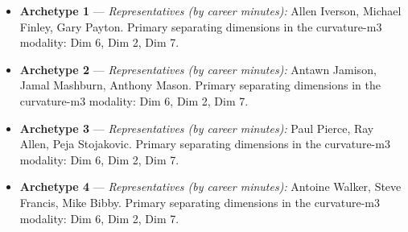 \begin{itemize}
\item \textbf{Archetype 1} --- \emph{Representatives (by career minutes):} Allen Iverson, Michael Finley, Gary Payton. Primary separating dimensions in the curvature-m3 modality: Dim 6, Dim 2, Dim 7.
\item \textbf{Archetype 2} --- \emph{Representatives (by career minutes):} Antawn Jamison, Jamal Mashburn, Anthony Mason. Primary separating dimensions in the curvature-m3 modality: Dim 6, Dim 2, Dim 7.
\item \textbf{Archetype 3} --- \emph{Representatives (by career minutes):} Paul Pierce, Ray Allen, Peja Stojakovic. Primary separating dimensions in the curvature-m3 modality: Dim 6, Dim 2, Dim 7.
\item \textbf{Archetype 4} --- \emph{Representatives (by career minutes):} Antoine Walker, Steve Francis, Mike Bibby. Primary separating dimensions in the curvature-m3 modality: Dim 6, Dim 2, Dim 7.
\end{itemize}
